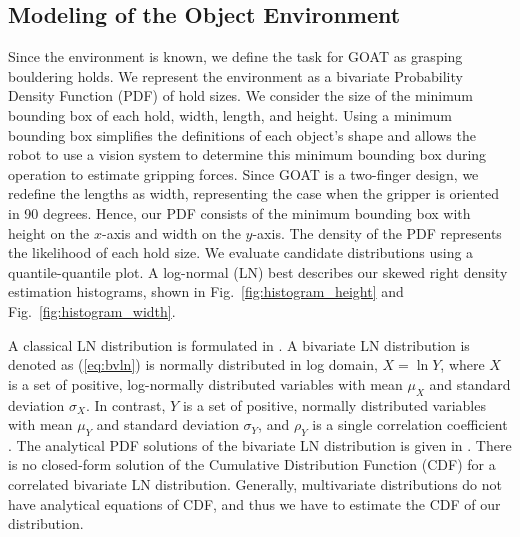 \documentclass[letterpaper, 10 pt, conference]{ieeeconf}  %
\newcommand{\fig}[1]{Fig.~\ref{#1}}
\newcommand{\eq}[1]{(\ref{#1})}
\begin{document}
\subsection{Modeling of the Object Environment \label{sec:environment}}
Since the environment is known, we define the task for GOAT as grasping bouldering holds.
We represent the environment as a bivariate Probability Density Function (PDF) of hold sizes. 
We consider the size of the minimum bounding box of each hold, width, length, and height.
Using a minimum bounding box simplifies the definitions of each object's shape and allows the robot to use a vision system to determine this minimum bounding box during operation to estimate gripping forces.
Since GOAT is a two-finger design, we redefine the lengths as width, representing the case when the gripper is oriented in 90 degrees. Hence, our PDF consists of the minimum bounding box 
with height on the $x$-axis and width on the $y$-axis. 
The density of the PDF represents the likelihood of each hold size.
We evaluate candidate distributions using a quantile-quantile plot. A log-normal (LN) best describes our skewed right density estimation histograms, shown in \fig{fig:histogram_height} and \fig{fig:histogram_width}.

A classical LN distribution is formulated in \cite{log_normal_57}. A bivariate LN distribution is denoted as \eq{eq:bvln}
is normally distributed in log domain, ${X}=\ln {Y}$, where $X$ is a set of positive, log-normally distributed variables with mean ${\mu_X}$ and standard deviation ${\sigma_X}$. In contrast, $Y$ is a set of positive, normally distributed variables with mean ${\mu_Y}$ and standard deviation ${\sigma_Y}$, and $\rho_{{Y}}$ is a single  correlation coefficient \cite{log_normal_history}. The analytical PDF solutions of the bivariate LN distribution is given in \cite{log_normal_57}. There is no closed-form solution of the Cumulative Distribution Function (CDF) for a correlated bivariate LN distribution. Generally, multivariate distributions do not have analytical equations of CDF, and thus we have to estimate the CDF of our distribution. 
\end{document}
